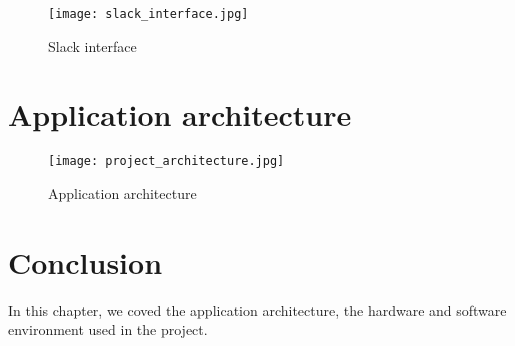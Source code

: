 \begin{figure}[!ht]
    \centering
    \texttt{[image: slack\_interface.jpg]}
    \caption{Slack interface}
    \label{fig:slack_interface}
\end{figure}


\section{Application architecture}

\vfill
\clearpage

\begin{figure}[!ht]
    \centering
    \texttt{[image: project\_architecture.jpg]}
    \caption{Application architecture}
    \label{fig:slack_interface}
\end{figure}



\section*{Conclusion}
In this chapter, we coved the application architecture, the hardware and software environment used in the project.

